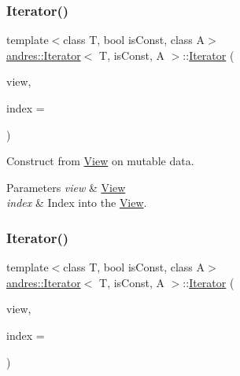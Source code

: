 \subsubsection{\texorpdfstring{Iterator()}{Iterator()}\hspace{0.1cm}{\footnotesize\ttfamily [3/5]}}
{\footnotesize\ttfamily template$<$class T, bool is\+Const, class A$>$ \\
\hyperlink{classandres_1_1Iterator}{andres\+::\+Iterator}$<$ T, is\+Const, A $>$\+::\hyperlink{classandres_1_1Iterator}{Iterator} (\begin{DoxyParamCaption}\item[{\hyperlink{classandres_1_1View}{View}$<$ T, false, A $>$ \&}]{view,  }\item[{const std\+::size\+\_\+t}]{index = {} }\end{DoxyParamCaption})\hspace{0.3cm}{\ttfamily [inline]}}

Construct from \hyperlink{classandres_1_1View}{View} on mutable data.


\begin{DoxyParams}{Parameters}
{\em view} & \hyperlink{classandres_1_1View}{View} \\
\hline
{\em index} & Index into the \hyperlink{classandres_1_1View}{View}. \\
\hline
\end{DoxyParams}
\mbox{\label{classandres_1_1Iterator_aba0cdb5062a14318d9c45c6c71646285}} 
\subsubsection{\texorpdfstring{Iterator()}{Iterator()}\hspace{0.1cm}{\footnotesize\ttfamily [4/5]}}
{\footnotesize\ttfamily template$<$class T, bool is\+Const, class A$>$ \\
\hyperlink{classandres_1_1Iterator}{andres\+::\+Iterator}$<$ T, is\+Const, A $>$\+::\hyperlink{classandres_1_1Iterator}{Iterator} (\begin{DoxyParamCaption}\item[{const \hyperlink{classandres_1_1View}{View}$<$ T, true, A $>$ \&}]{view,  }\item[{const std\+::size\+\_\+t}]{index = {} }\end{DoxyParamCaption})\hspace{0.3cm}{\ttfamily [inline]}}

